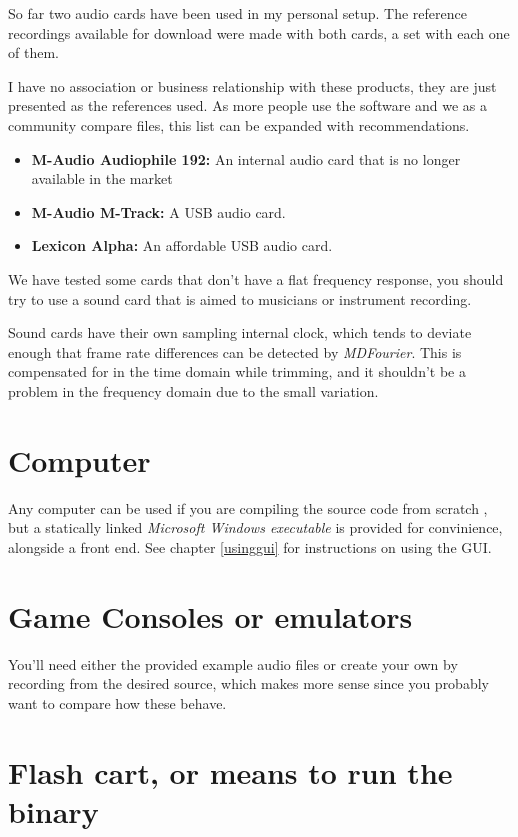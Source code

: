 \documentclass[10pt,a4paper]{report}
\begin{document}
\begin{appendices}
So far two audio cards have been used in my personal setup. The reference recordings available for download were made with both cards, a set with each one of them.

I have no association or business relationship with these products, they are just presented as the references used. As more people use the software and we as a community compare files, this list can be expanded with recommendations.

\begin{itemize}
	\item \textbf{M-Audio Audiophile 192:} An internal audio card that is no longer available in the market \cite{maudio}
	\item \textbf{M-Audio M-Track:} A USB audio card. \cite{maudiomtrack}
	\item \textbf{Lexicon Alpha:} An affordable USB audio card. \cite{lexicon}
\end{itemize}

We have tested some cards that don't have a flat frequency response, you should try to use a sound card that is aimed to musicians or instrument recording.

Sound cards have their own sampling internal clock, which tends to deviate enough that frame rate differences can be detected by \textit{MDFourier}. This is compensated for in the time domain while trimming, and it shouldn't be a problem in the frequency domain due to the small variation. \cite{SoundCardClock}

\section{Computer}

Any computer can be used if you are compiling the source code from scratch \cite{sourcecode}, but a statically linked \textit{Microsoft Windows executable} is provided for convinience, alongside a front end. See chapter \ref{usinggui} for instructions on using the GUI.

\section{Game Consoles or emulators}

You'll need either the provided example audio files or create your own by recording from the desired source, which makes more sense since you probably want to compare how these behave.

\section{Flash cart, or means to run the binary}


\end{appendices}
\end{document}
